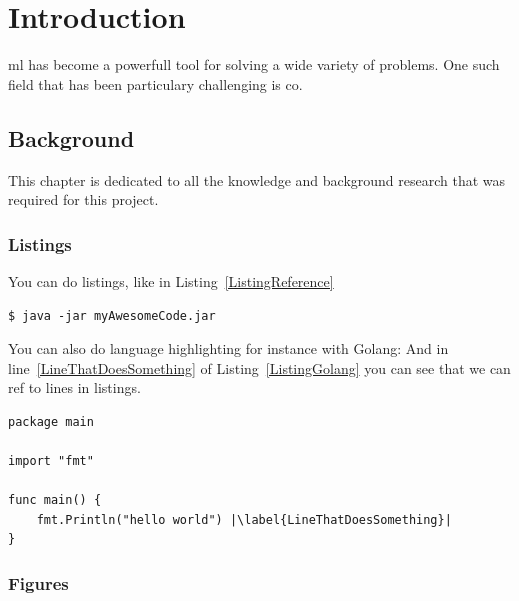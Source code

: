 \chapter{Introduction}

\gls{ml} has become a powerfull tool for solving a wide variety of problems. One such field that has been particulary challenging is \gls{co}. 

\section{Background}

This chapter is dedicated to all the knowledge and background research that was required for this project.

\subsection{Listings}
You can do listings, like in Listing~\ref{ListingReference}
\begin{lstlisting}[caption={[Short caption]Look at this cool listing. Find the rest in Appendix~\ref{Listing}},label=ListingReference]
$ java -jar myAwesomeCode.jar
\end{lstlisting}

You can also do language highlighting for instance with Golang:
And in line~\ref{LineThatDoesSomething} of Listing~\ref{ListingGolang} you can see that we can ref to lines in listings.

\begin{lstlisting}[caption={Hello world in Golang},label=ListingGolang,escapechar=|]
package main

import "fmt"

func main() {
    fmt.Println("hello world") |\label{LineThatDoesSomething}|
}

\end{lstlisting}

\subsection{Figures}


